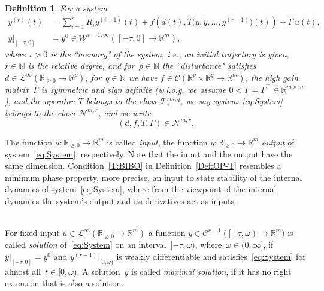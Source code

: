 \documentclass[ envcountsect, envcountsame]{svjour3}
\newtheorem{Definition}[Theorem]{Definition}
\newcommand{\R}{\mathbb{R}}
\newcommand{\N}{\mathbb{N}}
\newcommand{\cC}{\mathcal{C}}
\newcommand{\cL}{\mathcal{L}}
\newcommand{\cN}{\mathcal{N}}
\newcommand{\cT}{\mathcal{T}}
\newcommand{\cW}{\mathcal{W}}
\newcommand{\rp}{\mathbb{R}_{\geq 0}}
\begin{document}
%
\begin{Definition}
For a system
\begin{equation} \label{eq:System}
\begin{aligned}
y^{(r)}(t) &= \sum_{i=1}^r R_i y^{(i-1)}(t) + f\left(d(t), T\big(y,\dot y,\ldots,y^{(r-1)}\big)(t) \right) + \Gamma \, u(t), \\
y|_{[-\tau,0]} &= y^0 \in \cW^{r-1, \infty}([-\tau,0] \to \R^m),
\end{aligned}
\end{equation}
where $\tau > 0$ is the ``memory" of the system, i.e., an initial trajectory is given, $r \in \N$ is the relative degree, and
for~$p \in \N$ the ``disturbance" satisfies $d \in \cL^\infty(\rp \to \R^p)$,
for~$q \in \N$ we have $f \in \cC(\R^p \times \R^q \to \R^m)$,
the high gain matrix~$\Gamma$ is symmetric and sign definite (w.l.o.g. we assume $0<\Gamma = \Gamma^\top \in \R^{m \times m}$),
and the operator~$T$ belongs to the class~$\cT^{rm,q}_\tau$, 
we say system~\eqref{eq:System} belongs to the class~$\cN^{m,r}$, and we write 
\begin{equation*}
(d,f,T,\Gamma) \in \cN^{m,r}.
\end{equation*}
\end{Definition}
%
The function $u:\rp \to \R^m$ is called \textit{input}, the function $y : \rp \to \R^m$ \textit{output} of system~\eqref{eq:System}, respectively.
Note that the input and the output have the same dimension.
Condition~\ref{T:BIBO} in Definition~\ref{Def:OP-T} resembles a minimum phase property, more precise, an input to state stability of the internal dynamics of system~\eqref{eq:System}, 
where from the viewpoint of the internal dynamics the system's output and its derivatives act as inputs.
%
%

\ \\
For fixed input $u \in \cL^\infty(\rp \to \R^m)$ a function $y \in \cC^{r-1}([-\tau,\omega) \to \R^m)$ is called 
\textit{solution} of~\eqref{eq:System} on an interval~$[-\tau,\omega)$, where~$\omega \in (0,\infty]$, 
if $y|_{[-\tau,0]} = y^0$ and $y^{(r-1)}|_{[0,\omega)}$ is weakly differentiable and satisfies~\eqref{eq:System} for almost all~$t \in [0,\omega)$.
A solution~$y$ is called \textit{maximal solution}, if it has no right extension that is also a solution. 
\end{document}

